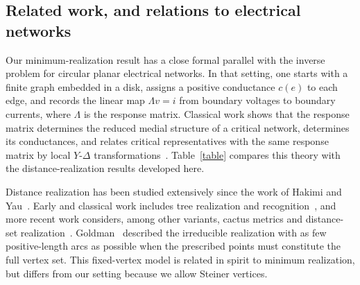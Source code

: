 \documentclass[11pt]{article}
\begin{document}
\subsection{Related work, and relations to electrical networks}\label{subsec:related}

Our minimum-realization result has a close formal parallel with the inverse problem for circular planar electrical networks. In that setting, one starts with a finite graph embedded in a disk, assigns a positive conductance $c(e)$ to each edge, and records the linear map $\Lambda v=i$ from boundary voltages to boundary currents, where $\Lambda$ is the response matrix. Classical work shows that the response matrix determines the reduced medial structure of a critical network, determines its conductances, and relates critical representatives with the same response matrix by local $Y$-$\Delta$ transformations~\cite{de1996,curtis1998,kenyon2008,kenyon2011}. Table~\ref{table} compares this theory with the distance-realization results developed here.

Distance realization has been studied extensively since the work of Hakimi and Yau~\cite{HakimiYau65}. Early and classical work includes tree realization and recognition~\cite{patrinos1972distance,pereira1969note,simoes1982submatrices,simoes1987graph,bandelt1990recognition,varone1998trees,buneman1974note,dress1984trees}, and more recent work considers, among other variants, cactus metrics and distance-set realization~\cite{hayamizu2020recognizing,bar2022graph,bar2023composed}. Goldman~\cite{Goldman66} described the irreducible realization with as few positive-length arcs as possible when the prescribed points must constitute the full vertex set. This fixed-vertex model is related in spirit to minimum realization, but differs from our setting because we allow Steiner vertices.
\end{document}
